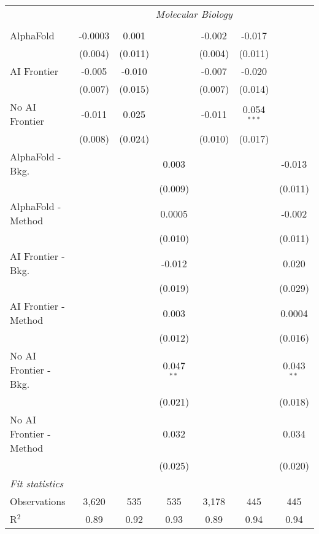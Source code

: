 \begin{tabular}{lcccccc}
 & \multicolumn{6}{c}{\textit{Molecular Biology}} \\ \\
   AlphaFold               & -0.0003 & 0.001   &              & -0.002  & -0.017        &   \\   
                           & (0.004) & (0.011) &              & (0.004) & (0.011)       &   \\   
   AI Frontier             & -0.005  & -0.010  &              & -0.007  & -0.020        &   \\   
                           & (0.007) & (0.015) &              & (0.007) & (0.014)       &   \\   
   No AI Frontier          & -0.011  & 0.025   &              & -0.011  & 0.054$^{***}$ &   \\   
                           & (0.008) & (0.024) &              & (0.010) & (0.017)       &   \\   
   AlphaFold - Bkg.        &         &         & 0.003        &         &               & -0.013\\   
                           &         &         & (0.009)      &         &               & (0.011)\\   
   AlphaFold - Method      &         &         & 0.0005       &         &               & -0.002\\   
                           &         &         & (0.010)      &         &               & (0.011)\\   
   AI Frontier - Bkg.      &         &         & -0.012       &         &               & 0.020\\   
                           &         &         & (0.019)      &         &               & (0.029)\\   
   AI Frontier - Method    &         &         & 0.003        &         &               & 0.0004\\   
                           &         &         & (0.012)      &         &               & (0.016)\\   
   No AI Frontier - Bkg.   &         &         & 0.047$^{**}$ &         &               & 0.043$^{**}$\\   
                           &         &         & (0.021)      &         &               & (0.018)\\   
   No AI Frontier - Method &         &         & 0.032        &         &               & 0.034\\   
                           &         &         & (0.025)      &         &               & (0.020)\\   
   \midrule
   \emph{Fit statistics}\\
   Observations            & 3,620   & 535     & 535          & 3,178   & 445           & 445\\  
   R$^2$                   & 0.89    & 0.92    & 0.93         & 0.89    & 0.94          & 0.94\\  
   

\end{tabular}
